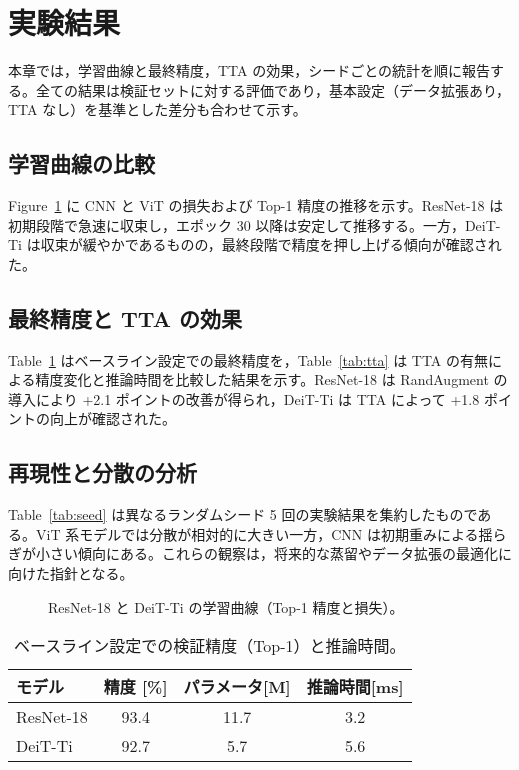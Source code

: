 \section{実験結果}\label{sec:results}
本章では，学習曲線と最終精度，TTA の効果，シードごとの統計を順に報告する。全ての結果は検証セットに対する評価であり，基本設定（データ拡張あり，TTA なし）を基準とした差分も合わせて示す。

\subsection{学習曲線の比較}
Figure~\ref{fig:learning_curve} に CNN と ViT の損失および Top-1 精度の推移を示す。ResNet-18 は初期段階で急速に収束し，エポック 30 以降は安定して推移する。一方，DeiT-Ti は収束が緩やかであるものの，最終段階で精度を押し上げる傾向が確認された。

\subsection{最終精度と TTA の効果}
Table~\ref{tab:baseline} はベースライン設定での最終精度を，Table~\ref{tab:tta} は TTA の有無による精度変化と推論時間を比較した結果を示す。ResNet-18 は RandAugment の導入により +2.1 ポイントの改善が得られ，DeiT-Ti は TTA によって +1.8 ポイントの向上が確認された。

\subsection{再現性と分散の分析}
Table~\ref{tab:seed} は異なるランダムシード 5 回の実験結果を集約したものである。ViT 系モデルでは分散が相対的に大きい一方，CNN は初期重みによる揺らぎが小さい傾向にある。これらの観察は，将来的な蒸留やデータ拡張の最適化に向けた指針となる。

\begin{figure}[t]
  \centering
  \caption{ResNet-18 と DeiT-Ti の学習曲線（Top-1 精度と損失）。}
  \label{fig:learning_curve}
\end{figure}

\begin{table}[t]
  \centering
  \caption{ベースライン設定での検証精度（Top-1）と推論時間。}
  \label{tab:baseline}
  \begin{tabular}{lccc}
    \hline
    モデル & 精度 [\%] & パラメータ[M] & 推論時間[ms] \\
    \hline
    ResNet-18 & 93.4 & 11.7 & 3.2 \\
    DeiT-Ti & 92.7 & 5.7 & 5.6 \\
    \hline
  \end{tabular}
\end{table}

